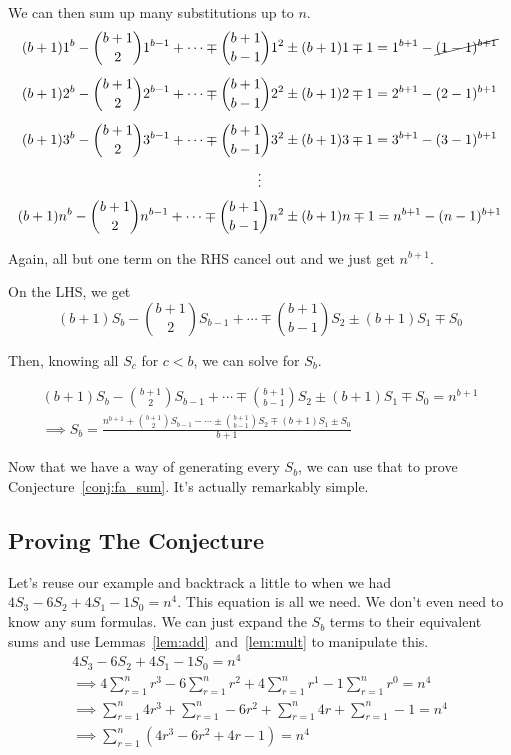 \documentclass[a4paper]{article}
\newcommand{\sn}{\sum\limits_{r=1}^{n}}
\begin{document}
We can then sum up many substitutions up to $n$.
\begin{gather*}
(b+1)1^b - \binom{b+1}{2}1^{b-1} + \cdots \mp \binom{b+1}{b-1}1^2 \pm (b+1)1 \mp 1 = 1^{b+1} - \cancel{(1-1)^{b+1}}\\[0.5em]
(b+1)2^b - \binom{b+1}{2}2^{b-1} + \cdots \mp \binom{b+1}{b-1}2^2 \pm (b+1)2 \mp 1 = 2^{b+1} - (2-1)^{b+1}\\[0.5em]
(b+1)3^b - \binom{b+1}{2}3^{b-1} + \cdots \mp \binom{b+1}{b-1}3^2 \pm (b+1)3 \mp 1 = 3^{b+1} - (3-1)^{b+1}\\[0.2em]
\vdots\\[0.2em]
(b+1)n^b - \binom{b+1}{2}n^{b-1} + \cdots \mp \binom{b+1}{b-1}n^2 \pm (b+1)n \mp 1 = n^{b+1} - (n-1)^{b+1}
\end{gather*}

Again, all but one term on the RHS cancel out and we just get $n^{b+1}$.

On the LHS, we get $$(b+1)S_b - \binom{b+1}{2}S_{b-1} + \cdots \mp \binom{b+1}{b-1}S_2 \pm (b+1)S_1 \mp S_0$$

Then, knowing all $S_c$ for $c < b$, we can solve for $S_b$.

\begin{gather*}
(b+1)S_b - \binom{b+1}{2}S_{b-1} + \cdots \mp \binom{b+1}{b-1}S_2 \pm (b+1)S_1 \mp S_0 = n^{b+1}\\[0.5em]
\implies S_b  = \frac{n^{b+1} + \binom{b+1}{2}S_{b-1} - \cdots \pm \binom{b+1}{b-1}S_2 \mp (b+1) S_1 \pm S_0}{b+1}
\end{gather*}

Now that we have a way of generating every $S_b$, we can use that to prove Conjecture~\ref{conj:fa_sum}. It's actually remarkably simple.

\subsection{Proving The Conjecture}

Let's reuse our example and backtrack a little to when we had $4S_3 - 6S_2 + 4S_1 - 1S_0 = n^4$. This equation is all we need. We don't even need to know any sum formulas. We can just expand the $S_b$ terms to their equivalent sums and use Lemmas~\ref{lem:add}~and~\ref{lem:mult} to manipulate this.
\begin{gather*}
4S_3 - 6S_2 + 4S_1 - 1S_0 = n^4\\[0.5em]
\implies 4 \sn r^3 - 6 \sn r^2 + 4 \sn r^1 - 1 \sn r^0 = n^4\\[0.5em]
\implies \sn 4r^3 + \sn -6r^2 + \sn 4r + \sn -1 = n^4\\[0.5em]
\implies \sn (4r^3 - 6r^2 + 4r - 1) = n^4
\end{gather*}
\end{document}
